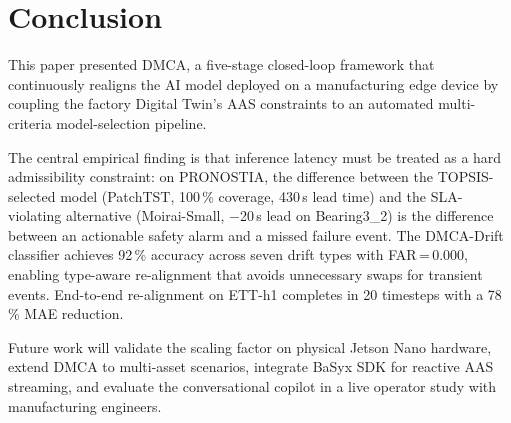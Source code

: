 \documentclass[12pt,a4paper]{article}
\begin{document}
\section{Conclusion}
\label{sec:conclusion}

This paper presented DMCA, a five-stage closed-loop framework that
continuously realigns the AI model deployed on a manufacturing edge
device by coupling the factory Digital Twin's AAS constraints to
an automated multi-criteria model-selection pipeline.

The central empirical finding is that inference latency must be
treated as a hard admissibility constraint: on PRONOSTIA, the
difference between the TOPSIS-selected model (PatchTST, 100\,\%
coverage, 430\,s lead time) and the SLA-violating alternative
(Moirai-Small, $-$20\,s lead on Bearing3\_2) is the difference
between an actionable safety alarm and a missed failure event.
The DMCA-Drift classifier achieves 92\,\% accuracy across seven
drift types with FAR\,=\,0.000, enabling type-aware re-alignment
that avoids unnecessary swaps for transient events.
End-to-end re-alignment on ETT-h1 completes in 20 timesteps with
a 78\,\% MAE reduction.

Future work will validate the scaling factor on physical Jetson Nano
hardware, extend DMCA to multi-asset scenarios, integrate BaSyx SDK
for reactive AAS streaming, and evaluate the conversational copilot
in a live operator study with manufacturing engineers.
\end{document}
